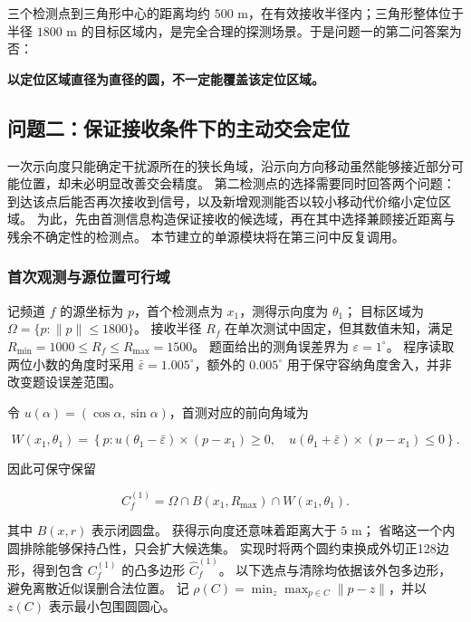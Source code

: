 \documentclass[UTF8,a4paper,zihao=5,fontset=fandol]{ctexart}
\begin{document}
三个检测点到三角形中心的距离均约 $500$ m，在有效接收半径内；三角形整体位于半径 $1800$ m 的目标区域内，是完全合理的探测场景。于是问题一的第二问答案为否：

\textbf{以定位区域直径为直径的圆，不一定能覆盖该定位区域。}


\subsection{问题二：保证接收条件下的主动交会定位}\label{sec:q2}

一次示向度只能确定干扰源所在的狭长角域，沿示向方向移动虽然能够接近部分可能位置，却未必明显改善交会精度。
第二检测点的选择需要同时回答两个问题：到达该点后能否再次接收到信号，以及新增观测能否以较小移动代价缩小定位区域。
为此，先由首测信息构造保证接收的候选域，再在其中选择兼顾接近距离与残余不确定性的检测点。
本节建立的单源模块将在第三问中反复调用。

\subsubsection{首次观测与源位置可行域}\label{sec:q2-1}

记频道 \(f\) 的源坐标为 \(p\)，首个检测点为 \(x_1\)，测得示向度为 \(\theta_1\)；
目标区域为 \(\Omega=\{p:\|p\|\le1800\}\)。
接收半径 \(R_f\) 在单次测试中固定，但其数值未知，满足 \(R_{\min}=1000\le R_f\le R_{\max}=1500\)。
题面给出的测角误差界为 \(\varepsilon=1^\circ\)。
程序读取两位小数的角度时采用 \(\bar\varepsilon=1.005^\circ\)，额外的 \(0.005^\circ\) 用于保守容纳角度舍入，并非改变题设误差范围。

令 \(u(\alpha)=(\cos\alpha,\sin\alpha)\)，首测对应的前向角域为

\begin{equation}\label{eq:q2-1}
W(x_1,\theta_1)=\left\{p:
u(\theta_1-\bar\varepsilon)\times(p-x_1)\ge0,\quad
u(\theta_1+\bar\varepsilon)\times(p-x_1)\le0
\right\}.
\end{equation}

因此可保守保留

\begin{equation}\label{eq:q2-2}
C_f^{(1)}=\Omega\cap B(x_1,R_{\max})\cap W(x_1,\theta_1).
\end{equation}

其中 \(B(x,r)\) 表示闭圆盘。
获得示向度还意味着距离大于 \(5\) m；
省略这一个内圆排除能够保持凸性，只会扩大候选集。
实现时将两个圆约束换成外切正128边形，得到包含 \(C_f^{(1)}\) 的凸多边形 \(\widehat C_f^{(1)}\)。
以下选点与清除均依据该外包多边形，避免离散近似误删合法位置。
记 \(\rho(C)=\min_z\max_{p\in C}\|p-z\|\)，并以 \(z(C)\) 表示最小包围圆圆心。
\end{document}
